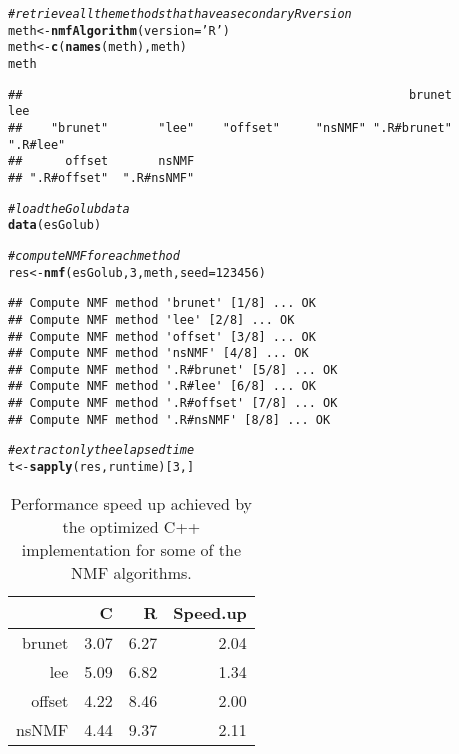 \documentclass[a4paper]{article}\usepackage[]{graphicx}\usepackage[]{color}
\makeatletter
\newcommand{\hlnum}[1]{\textcolor[rgb]{0.686,0.059,0.569}{#1}}%
\newcommand{\hlstr}[1]{\textcolor[rgb]{0.192,0.494,0.8}{#1}}%
\newcommand{\hlcom}[1]{\textcolor[rgb]{0.678,0.584,0.686}{\textit{#1}}}%
\newcommand{\hlstd}[1]{\textcolor[rgb]{0.345,0.345,0.345}{#1}}%
\newcommand{\hlkwb}[1]{\textcolor[rgb]{0.69,0.353,0.396}{#1}}%
\newcommand{\hlkwc}[1]{\textcolor[rgb]{0.333,0.667,0.333}{#1}}%
\newcommand{\hlkwd}[1]{\textcolor[rgb]{0.737,0.353,0.396}{\textbf{#1}}}%
\newenvironment{kframe}{%
 \def\at@end@of@kframe{}%
 \ifinner\ifhmode%
  \def\at@end@of@kframe{\end{minipage}}%
  \begin{minipage}{\columnwidth}%
 \fi\fi%
 \def\FrameCommand##1{\hskip\@totalleftmargin \hskip-\fboxsep
 \colorbox{shadecolor}{##1}\hskip-\fboxsep
     \hskip-\linewidth \hskip-\@totalleftmargin \hskip\columnwidth}%
 \MakeFramed {\advance\hsize-\width
   \@totalleftmargin\z@ \linewidth\hsize
   \@setminipage}}%
 {\par\unskip\endMakeFramed%
 \at@end@of@kframe}
\newenvironment{knitrout}{}{} %
\makeatother
\begin{document}
\begin{knitrout}
\color{fgcolor}\begin{kframe}
\begin{alltt}
\hlcom{# retrieve all the methods that have a secondary R version}
\hlstd{meth} \hlkwb{<-} \hlkwd{nmfAlgorithm}\hlstd{(}\hlkwc{version}\hlstd{=}\hlstr{'R'}\hlstd{)}
\hlstd{meth} \hlkwb{<-} \hlkwd{c}\hlstd{(}\hlkwd{names}\hlstd{(meth), meth)}
\hlstd{meth}
\end{alltt}
\begin{verbatim}
##                                                      brunet         lee 
##    "brunet"       "lee"    "offset"     "nsNMF" ".R#brunet"    ".R#lee" 
##      offset       nsNMF 
## ".R#offset"  ".R#nsNMF"
\end{verbatim}
\begin{alltt}
\hlcom{# load the Golub data}
\hlkwd{data}\hlstd{(esGolub)}

\hlcom{# compute NMF for each method}
\hlstd{res} \hlkwb{<-} \hlkwd{nmf}\hlstd{(esGolub,} \hlnum{3}\hlstd{, meth,} \hlkwc{seed}\hlstd{=}\hlnum{123456}\hlstd{)}
\end{alltt}
\begin{verbatim}
## Compute NMF method 'brunet' [1/8] ... OK
## Compute NMF method 'lee' [2/8] ... OK
## Compute NMF method 'offset' [3/8] ... OK
## Compute NMF method 'nsNMF' [4/8] ... OK
## Compute NMF method '.R#brunet' [5/8] ... OK
## Compute NMF method '.R#lee' [6/8] ... OK
## Compute NMF method '.R#offset' [7/8] ... OK
## Compute NMF method '.R#nsNMF' [8/8] ... OK
\end{verbatim}
\begin{alltt}
\hlcom{# extract only the elapsed time}
\hlstd{t} \hlkwb{<-} \hlkwd{sapply}\hlstd{(res, runtime)[}\hlnum{3}\hlstd{,]}
\end{alltt}
\end{kframe}
\end{knitrout}

\begin{table}[ht]
\centering
\begin{tabular}{rrrr}
  \hline
 & C & R & Speed.up \\ 
  \hline
brunet & 3.07 & 6.27 & 2.04 \\ 
  lee & 5.09 & 6.82 & 1.34 \\ 
  offset & 4.22 & 8.46 & 2.00 \\ 
  nsNMF & 4.44 & 9.37 & 2.11 \\ 
   \hline
\end{tabular}
\caption{Performance speed up achieved by the optimized C++ implementation for some of the NMF algorithms.} 
\label{tab:perf}
\end{table}
\end{document}
